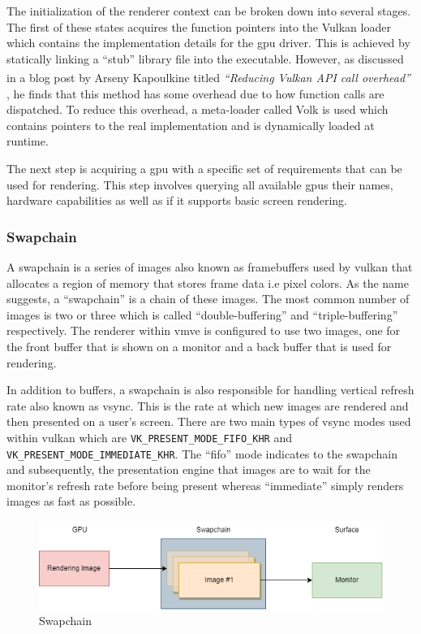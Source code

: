 \documentclass[11pt]{article}
\begin{document}
The initialization of the renderer context can be broken down into several
stages. The first of these states acquires the function pointers into the Vulkan
loader which contains the implementation details for the \gls*{gpu} driver. This
is achieved by statically linking a ``stub'' library file into the executable.
However, as discussed in a blog post by Arseny Kapoulkine titled
\textit{``Reducing Vulkan\textsuperscript{\textregistered} API call overhead''}
\cite{volk}, he finds that this method has some overhead due to how function
calls are dispatched. To reduce this overhead, a meta-loader called Volk is used
which contains pointers to the real implementation and is dynamically loaded at
runtime.

The next step is acquiring a \gls*{gpu} with a specific set of requirements that
can be used for rendering. This step involves querying all available \glspl*{gpu}
their names, hardware capabilities as well as if it supports basic screen
rendering.

\subsubsection{Swapchain}
A swapchain is a series of images also known as framebuffers used by
\gls*{vulkan} that allocates a region of memory that stores frame data i.e pixel
colors. As the name suggests, a ``swapchain'' is a chain of these images. The
most common number of images is two or three which is called
``double-buffering'' and ``triple-buffering'' respectively. The renderer within
\gls*{vmve} is configured to use two images, one for the front buffer that is shown
on a monitor and a back buffer that is used for rendering.

In addition to buffers, a swapchain is also responsible for handling vertical
refresh rate also known as vsync. This is the rate at which new images are
rendered and then presented on a user's screen. There are two main types of
vsync modes used within \gls*{vulkan} which are
\lstinline{VK_PRESENT_MODE_FIFO_KHR} and
\lstinline{VK_PRESENT_MODE_IMMEDIATE_KHR}. The ``fifo'' mode indicates to the 
swapchain and subsequently, the presentation engine that images are to wait 
for the monitor's refresh rate before being present whereas ``immediate'' simply
renders images as fast as possible.

\begin{figure}[H]
  \centering
  \includegraphics[width=\textwidth]{images/swapchain.png}
  \caption{Swapchain}
  \label{fig:swapchain}
\end{figure}
\end{document}

